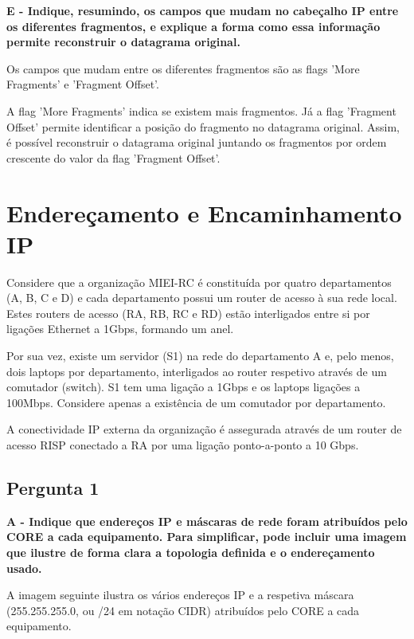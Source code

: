 \documentclass[11pt]{article}
\begin{document}
\textbf{E - Indique, resumindo, os campos que mudam no cabeçalho IP entre os diferentes fragmentos, e explique a forma como essa informação permite reconstruir o datagrama original.}

Os campos que mudam entre os diferentes fragmentos são as flags 'More Fragments' e 'Fragment Offset'.

A flag 'More Fragments' indica se existem mais fragmentos. Já a flag 'Fragment Offset' permite identificar a posição do fragmento no datagrama original. Assim, é possível reconstruir o datagrama original juntando os fragmentos por ordem crescente do valor da flag 'Fragment Offset'.




\clearpage
\section{Endereçamento e Encaminhamento IP}

Considere que a organização MIEI-RC é constituída por quatro
departamentos (A, B, C e D) e cada departamento possui um router de
acesso à sua rede local. Estes routers de acesso (RA, RB, RC e RD) estão interligados entre si por ligações Ethernet a 1Gbps, formando um anel.

Por sua vez, existe um servidor (S1) na rede do departamento A e, pelo menos, dois laptops por departamento, interligados ao router respetivo através de um comutador (switch). S1 tem uma ligação a 1Gbps e os laptops ligações a 100Mbps. Considere apenas a existência de um comutador por departamento.

A conectividade IP externa da organização é assegurada através de um router de acesso RISP conectado a RA por uma ligação ponto-a-ponto a 10 Gbps.

\vspace{0.5cm}

\subsection{Pergunta 1}

\textbf{A - Indique que endereços IP e máscaras de rede foram
atribuídos pelo CORE a cada equipamento. Para simplificar,
pode incluir uma imagem que ilustre de forma clara a
topologia definida e o endereçamento usado.}

A imagem seguinte ilustra os vários endereços IP e a respetiva máscara (255.255.255.0, ou /24 em notação CIDR) atribuídos pelo CORE a cada equipamento.
\end{document}
